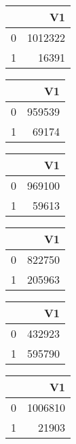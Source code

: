 \bigskip\bigskip
\centering
\begin{tabular}{rr}
  \hline
 & V1 \\ 
  \hline
0 & 1012322 \\ 
  1 & 16391 \\ 
   \hline
\end{tabular}

\bigskip\bigskip
\centering
\begin{tabular}{rr}
  \hline
 & V1 \\ 
  \hline
0 & 959539 \\ 
  1 & 69174 \\ 
   \hline
\end{tabular}

\bigskip\bigskip
\centering
\begin{tabular}{rr}
  \hline
 & V1 \\ 
  \hline
0 & 969100 \\ 
  1 & 59613 \\ 
   \hline
\end{tabular}

\bigskip\bigskip
\centering
\begin{tabular}{rr}
  \hline
 & V1 \\ 
  \hline
0 & 822750 \\ 
  1 & 205963 \\ 
   \hline
\end{tabular}

\bigskip\bigskip
\centering
\begin{tabular}{rr}
  \hline
 & V1 \\ 
  \hline
0 & 432923 \\ 
  1 & 595790 \\ 
   \hline
\end{tabular}

\bigskip\bigskip
\centering
\begin{tabular}{rr}
  \hline
 & V1 \\ 
  \hline
0 & 1006810 \\ 
  1 & 21903 \\ 
   \hline
\end{tabular}

